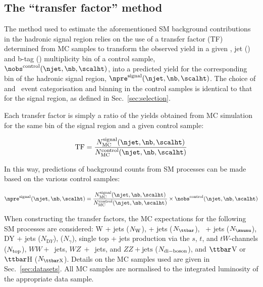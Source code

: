 \subsection{The ``transfer factor'' method}
\label{sec:ewk-method}

The method used to estimate the aforementioned SM background
contributions in the hadronic signal region relies on the use of a
transfer factor (TF) determined from MC samples to transform the
observed yield in a given \scalht, jet (\njet) and b-tag (\nb)
multiplicity bin of a control sample, $\nobs^{\rm
  control}(\njet,\nb,\scalht)$, into a predicted yield for the
corresponding bin of the hadronic signal region, $\npre^{\rm
  signal}(\njet,\nb,\scalht)$. The choice of \njet and \nb~event
categorisation and \scalht binning in the control samples is identical
to that for the signal region, as defined in
Sec.~\ref{sec:selection}. 

Each transfer factor is simply a ratio of the yields obtained from MC
simulation for the same bin of the signal region and a given control
sample:

\begin{equation}
  \label{equ:tf-ratio}
  {\rm TF} = \frac{N_{\rm MC}^{\rm signal}(\njet,\nb,\scalht)}{N_{\rm
      MC}^{\rm control}(\njet,\nb,\scalht)} 
\end{equation}

In this way, predictions of background counts from SM processes can be
made based on the various control samples:

\begin{equation}
  \label{equ:pred-method}
  \npre^{\rm signal}(\njet,\nb,\scalht) = \frac{N_{\rm MC}^{\rm
      signal}(\njet,\nb,\scalht)}{N_{\rm MC}^{\rm
      control}(\njet,\nb,\scalht)} \times \nobs^{\rm
    control}(\njet,\nb,\scalht)   
\end{equation}

When constructing the transfer factors, the MC expectations for the
following SM processes are considered: W + jets ($N_{\rm W}$), \ttbar
+ jets ($N_{\ttbar}$), \znunu\ + jets ($N_{\znunu}$), DY + jets
($N_{\mathrm DY}$), \gj ($N_\gamma$), single top + jets
production via the $s$, $t$, and $tW$-channels ($N_{\rm top}$), $WW+$~jets, $WZ~+$~jets, and $ZZ + \textrm{jets}$ ($N_{\rm di-boson}$), and $\ttbar$V or
$\ttbar$H ($N_{\rm {\ttbar}X}$). Details on the MC
samples used are given in Sec.~\ref{sec:datasets}. All MC samples
are normalised to the integrated luminosity of the appropriate data
sample.

